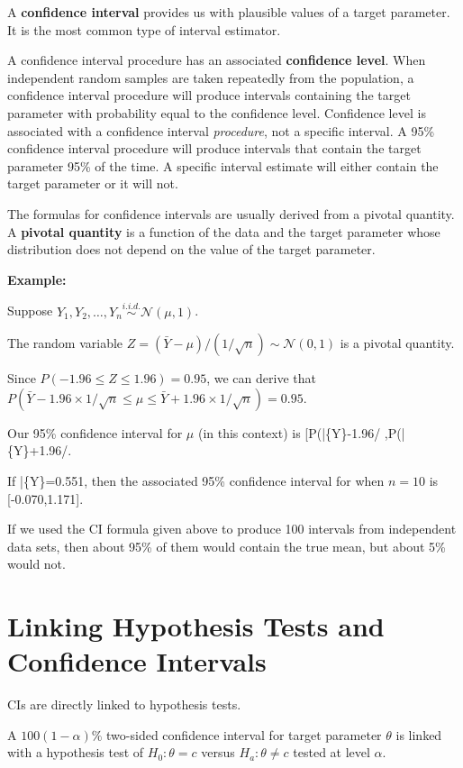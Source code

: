 \documentclass[
]{book}
\theoremstyle{definition}
\theoremstyle{definition}
\theoremstyle{definition}
\theoremstyle{definition}
\theoremstyle{remark}
\begin{document}
A \textbf{confidence interval} provides us with plausible values of a target parameter. It is the most common type of interval estimator.

A confidence interval procedure has an associated \textbf{confidence level}. When independent random samples are taken repeatedly from the population, a confidence interval procedure will produce intervals containing the target parameter with probability equal to the confidence level. Confidence level is associated with a confidence interval \emph{procedure}, not a specific interval. A 95\% confidence interval procedure will produce intervals that contain the target parameter 95\% of the time. A specific interval estimate will either contain the target parameter or it will not.

The formulas for confidence intervals are usually derived from a pivotal quantity. A \textbf{pivotal quantity} is a function of the data and the target parameter whose distribution does not depend on the value of the target
parameter.

\textbf{Example:}

Suppose \(Y_1,Y_2,\ldots,Y_n \stackrel{i.i.d.}{\sim} \mathcal{N}(\mu, 1)\).

The random variable \(Z=(\bar{Y}-\mu)/(1/\sqrt{n})\sim \mathcal{N}(0,1)\) is a pivotal quantity.

Since \(P(-1.96\leq Z\leq 1.96)=0.95\), we can derive that \(P(\bar{Y}-1.96\times 1/\sqrt{n}\leq \mu \leq \bar{Y}+1.96\times 1/\sqrt{n})=0.95\).

Our 95\% confidence interval for \(\mu\) (in this context) is {[}P(\bar\{Y\}-1.96/ ,P(\bar\{Y\}+1.96/\sqrt{n}{]}.

If \bar\{Y\}=0.551, then the associated 95\% confidence interval for \mu when \(n=10\) is {[}-0.070,1.171{]}.

If we used the CI formula given above to produce 100 intervals from
independent data sets, then about 95\% of them would contain the true mean, but about 5\% would not.

\hypertarget{linking-hypothesis-tests-and-confidence-intervals}{%
\section{Linking Hypothesis Tests and Confidence Intervals}\label{linking-hypothesis-tests-and-confidence-intervals}}

CIs are directly linked to hypothesis tests.

A \(100(1-\alpha)\%\) two-sided confidence interval for target parameter \(\theta\) is linked with a hypothesis test of \(H_0:\theta = c\) versus \(H_a:\theta \neq c\) tested at level
\(\alpha\).
\end{document}
